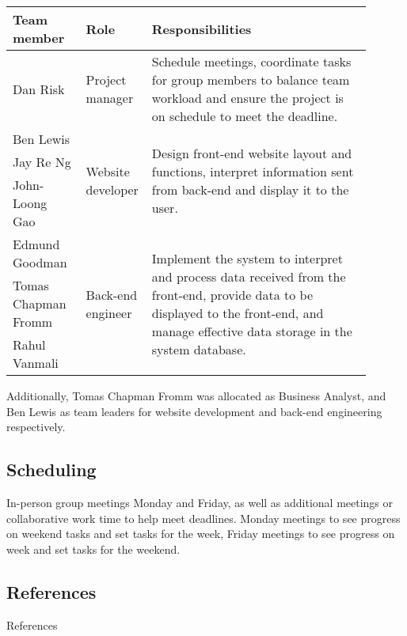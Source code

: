 \documentclass[10pt]{article}
\begin{document}
\begin{table}[H]
\begin{tabular}{p{0.2\linewidth}|p{0.1\linewidth}|p{0.6\linewidth}}
    \hline
    \textbf{Team member} & \textbf{Role}                      & \textbf{Responsibilities} \\ \hline\hline
    Dan Risk             & Project manager                    &
        Schedule meetings, coordinate tasks for group members to balance team
        workload and ensure the project is on schedule to meet the deadline.
    \\ \hline
    Ben Lewis            & \multirow{3}{1\linewidth}{Website developer} & \multirow{3}{1\linewidth}{
        Design front-end website layout and functions, interpret information
        sent from back-end and display it to the user.
    } \\
    Jay Re Ng            & \\
    John-Loong Gao       & \\ \hline
    Edmund Goodman       & \multirow{3}{1\linewidth}{Back-end engineer} & \multirow{3}{1\linewidth}{
        Implement the system to interpret and process data received from the
        front-end, provide data to be displayed to the front-end, and manage
        effective data storage in the system database.
    } \\
    Tomas Chapman Fromm  & \\
    Rahul Vanmali        & \\
    \hline
\end{tabular}
\end{table}

Additionally, Tomas Chapman Fromm was allocated as Business Analyst, and Ben        %
Lewis as team leaders for website development and back-end engineering
respectively.

\vspace{-4mm}\subsection{Scheduling}\vspace{-2mm}
In-person group meetings Monday and Friday, as well as additional meetings or
collaborative work time to help meet deadlines. Monday meetings to see progress
on weekend tasks and set tasks for the week, Friday meetings to see progress on
week and set tasks for the weekend.

\vspace{-4mm}\subsection{References}\vspace{-2mm}                                   %
References
\end{document}
